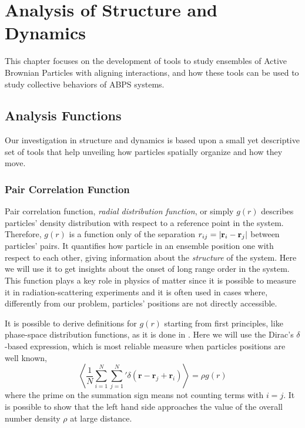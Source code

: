 \documentclass[../../master_thesis_np.tex]{subfiles}
\begin{document}
	\chapter{Analysis of Structure and Dynamics}

	This chapter focuses on the development of tools to study ensembles of Active Brownian Particles with aligning interactions, and how these tools can be used to study collective behaviors of ABPS systems.

	\section{Analysis Functions}
	Our investigation in structure and dynamics is based upon a small yet descriptive set of tools that help unveiling how particles spatially organize and how they move.
	
		\subsection{Pair Correlation Function}
		Pair correlation function, \emph{radial distribution function}, or simply $g(r)$ describes particles' density distribution with respect to a reference point in the system.
		Therefore, $g(r)$ is a function only of the separation $r_{ij} = \abs{\vb{r}_i - \vb{r}_j}$ between particles' pairs. 
		It quantifies how particle in an ensemble position one with respect to each other, giving information about the \emph{structure} of the system.
		Here we will use it to get insights about the onset of long range order in the system.
		This function plays a key role in physics of matter since it is possible to measure it in radiation-scattering experiments \cite{hansen90a} and it is often used in cases where, differently from our problem, particles' positions are not directly accessible.
		
		It is possible to derive definitions for $g(r)$ starting from first principles, like phase-space distribution functions, as it is done in \cite{hansen90a}. 
		Here we will use the Dirac's $\delta$-based expression, which is most reliable measure when particles positions are well known,
		\begin{equation}
			\left\langle \frac{1}{N} \sum_{i=1}^{N} \sum_{j=1}^{N}{}' \delta (\mathbf{r} - \mathbf{r}_j + \mathbf{r}_i) \right\rangle = \rho g(r)
		\end{equation}
		where the prime on the summation sign means not counting terms with $i = j$. 
		It is possible to show that the left hand side approaches the value of the overall number density $\rho$ at large distance.
		
\end{document}
